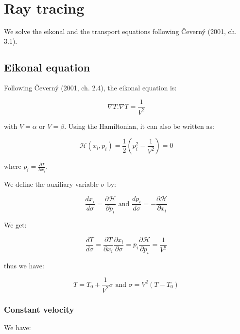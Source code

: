 \documentclass[workdone.tex]{subfiles}
\begin{document}
\section{Ray tracing}

We solve the eikonal and the transport equations following \v Cevern\'y (2001, ch. 3.1).

\subsection{Eikonal equation}

Following \v Cevern\'y (2001, ch. 2.4), the eikonal equation is:

\begin{equation}
\nabla T . \nabla T = \frac{1}{V^2}
\end{equation}

with $V = \alpha$ or $V= \beta$. Using the Hamiltonian, it can also be written as:

\begin{equation}
\mathcal H (x_i, p_i) = \frac{1}{2} (p_i^2 - \frac{1}{V^2}) = 0
\end{equation}

where $p_i = \frac{\partial T}{\partial x_i}$.

We define the auxiliary variable $\sigma$ by:

\begin{equation}
\frac{dx_i}{d\sigma} = \frac{\partial \mathcal H}{\partial p_i} \text{ and } \frac{dp_i}{d\sigma} = - \frac{\partial \mathcal H}{\partial x_i}
\end{equation}

We get:

\begin{equation}
\frac{dT}{d\sigma} = \frac{\partial T}{\partial x_i} \frac{\partial x_i}{\partial \sigma} = p_i \frac{\partial \mathcal H}{\partial p_i} = \frac{1}{V^2}
\end{equation}

thus we have:

\begin{equation}
T = T_0 + \frac{1}{V^2} \sigma \text{ and } \sigma = V^2 (T - T_0)
\end{equation}

\subsubsection{Constant velocity}

We have:
\end{document}
